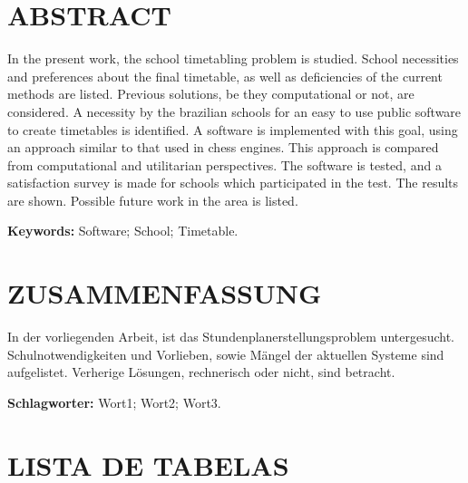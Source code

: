 \documentclass[12pt,a4paper]{article}
\begin{document}
	\thispagestyle{empty}
	\section*{ABSTRACT}

	In the present work, the school timetabling problem is studied. School necessities and preferences about the final timetable, as well as deficiencies of the current methods are listed. Previous solutions, be they computational or not, are considered. A necessity by the brazilian schools for an easy to use public software to create timetables is identified. A software is implemented with this goal, using an approach similar to that used in chess engines. This approach is compared from computational and utilitarian perspectives. The software is tested, and a satisfaction survey is made for schools which participated in the test. The results are shown. Possible future work in the area is listed.

	\begingroup
		\setlength{\parindent}{0mm}
		\textbf{Keywords:} Software; School; Timetable.
	\endgroup

	\newpage


	\thispagestyle{empty}
	\section*{ZUSAMMENFASSUNG}

	In der vorliegenden Arbeit, ist das Stundenplanerstellungsproblem untergesucht. Schulnotwendigkeiten und Vorlieben, sowie Mängel der aktuellen Systeme sind aufgelistet. Verherige Lösungen, rechnerisch oder nicht, sind betracht.

	\lipsum[1]


	\begingroup
		\setlength{\parindent}{0mm}
		\textbf{Schlagworter:} Wort1; Wort2; Wort3.
	\endgroup

	\newpage

	\thispagestyle{empty}
	\section*{LISTA DE TABELAS}

	\listoftables

	\newpage
\end{document}
